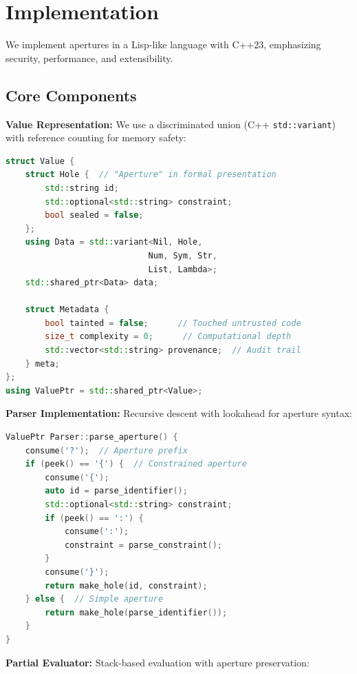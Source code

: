 \documentclass[12pt]{article}
\begin{document}
\section{Implementation}

We implement apertures in a Lisp-like language with C++23, emphasizing security, performance, and extensibility.

\subsection{Core Components}

\textbf{Value Representation:} We use a discriminated union (C++ \texttt{std::variant}) with reference counting for memory safety:

\begin{lstlisting}[language=C++]
struct Value {
    struct Hole {  // "Aperture" in formal presentation
        std::string id;
        std::optional<std::string> constraint;
        bool sealed = false;
    };
    using Data = std::variant<Nil, Hole, 
                             Num, Sym, Str, 
                             List, Lambda>;
    std::shared_ptr<Data> data;
    
    struct Metadata {
        bool tainted = false;      // Touched untrusted code
        size_t complexity = 0;      // Computational depth
        std::vector<std::string> provenance;  // Audit trail
    } meta;
};
using ValuePtr = std::shared_ptr<Value>;
\end{lstlisting}

\textbf{Parser Implementation:} Recursive descent with lookahead for aperture syntax:

\begin{lstlisting}[language=C++]
ValuePtr Parser::parse_aperture() {
    consume('?');  // Aperture prefix
    if (peek() == '{') {  // Constrained aperture
        consume('{');
        auto id = parse_identifier();
        std::optional<std::string> constraint;
        if (peek() == ':') {
            consume(':');
            constraint = parse_constraint();
        }
        consume('}');
        return make_hole(id, constraint);
    } else {  // Simple aperture
        return make_hole(parse_identifier());
    }
}
\end{lstlisting}

\textbf{Partial Evaluator:} Stack-based evaluation with aperture preservation:
\end{document}
